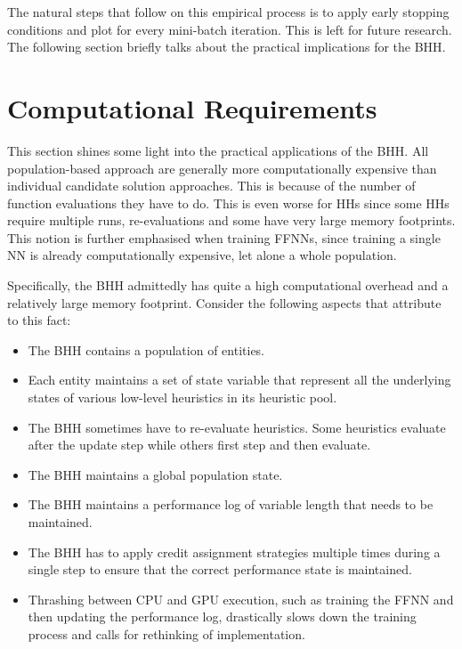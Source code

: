 The natural steps that follow on this empirical process is to apply early stopping conditions and plot for every mini-batch iteration. This is left for future research. The following section briefly talks about the practical implications for the \Ac{BHH}.


\section{Computational Requirements}
\label{sec:results:computational_requirements}

This section shines some light into the practical applications of the \Ac{BHH}. All population-based approach are generally more computationally expensive than individual candidate solution approaches. This is because of the number of function evaluations they have to do. This is even worse for \acp{HH} since some \acp{HH} require multiple runs, re-evaluations and some have very large memory footprints. This notion is further emphasised when training \acp{FFNN}, since training a single \ac{NN} is already computationally expensive, let alone a whole population.

Specifically, the \Ac{BHH} admittedly has quite a high computational overhead and a relatively large memory footprint. Consider the following aspects that attribute to this fact:

\begin{itemize}
	\item The \Ac{BHH} contains a population of entities.
	\item Each entity maintains a set of state variable that represent all the underlying states of various low-level heuristics in its heuristic pool.
	\item The \Ac{BHH} sometimes have to re-evaluate heuristics. Some heuristics evaluate after the update step while others first step and then evaluate.
	\item The \Ac{BHH} maintains a global population state.
	\item The \Ac{BHH} maintains a performance log of variable length that needs to be maintained.
	\item The \Ac{BHH} has to apply credit assignment strategies multiple times during a single step to ensure that the correct performance state is maintained.
	\item Thrashing between CPU and GPU execution, such as training the \Acs{FFNN} and then updating the performance log, drastically slows down the training process and calls for rethinking of  implementation.
\end{itemize}

